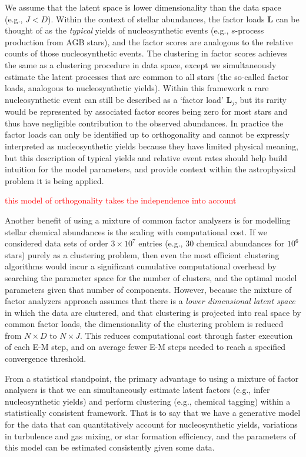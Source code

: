 \documentclass[twocolumn]{aastex61}
\newcommand{\todo}[1]{\textcolor{red}{#1}}
\newcommand{\factorloads}{\textbf{L}}
\newcommand{\NumDimensions}{D}
\newcommand{\NumLatentFactors}{J}
\newcommand{\numlatentfactors}{j}
\begin{document}
We assume that the latent space is lower dimensionality than the
data space (e.g., $\NumLatentFactors < \NumDimensions$).
Within the context of stellar abundances, the factor loads
$\factorloads$ can be thought of as the \emph{typical} yields
of nucleosynthetic
events (e.g., $s$-process production from AGB stars), and the
factor scores are analogous to the relative counts of those 
nucleosynthetic events. The clustering in factor scores
achieves the same as a clustering procedure in data space,
except we simultaneously estimate the latent processes that are
common to all stars (the so-called factor loads, analogous to 
nucleosynthetic yields). Within this framework a rare nucleosynthetic event
can still be described as a `factor load' $\factorloads_\numlatentfactors$, 
but its rarity would be represented by associated factor
scores being zero for most stars and thus have negligible contribution
to the observed abundances. In practice the factor loads can only be 
identified up to orthogonality and cannot be expressly interpreted as
nucleosynthetic yields because they have limited physical meaning,
but this description of typical yields and relative event rates should
help build intuition for the model parameters, and provide context
within the astrophysical problem it is being applied.

\todo{this model of orthogonality takes the independence into account}

Another benefit of using a mixture of common factor analysers is
for modelling stellar chemical abundances is the scaling with
computational cost. If we considered data sets of order $3\times10^7$
entries (e.g., 30 chemical abundances for $10^6$ stars) purely as a
clustering problem, then even the most efficient clustering
algorithms would incur a significant cumulative computational 
overhead by searching the parameter space for the number of
clusters, and the optimal model parameters given that number
of components. However, because the mixture of factor analyzers
approach assumes that there is a \emph{lower dimensional latent 
space} in which the data are clustered, and that clustering is 
projected into real space by common factor loads, the 
dimensionality of the clustering problem is reduced from 
$N \times D$ to $N \times J$. This reduces computational cost through
faster execution of each E-M step, and on average fewer E-M steps
needed to reach a specified convergence threshold.

From a statistical standpoint, the primary advantage to using
a mixture of factor analysers is that we can simultaneously
estimate latent factors (e.g., infer nucleosynthetic 
yields) and perform clustering (e.g., chemical tagging) 
within a statistically consistent framework. That is to say
that we have a generative model for the data that can 
quantitatively account for nucleosynthetic yields, variations in
turbulence and gas mixing, or star formation efficiency,
and the parameters of this model can be estimated consistently
given some data.
\end{document}
